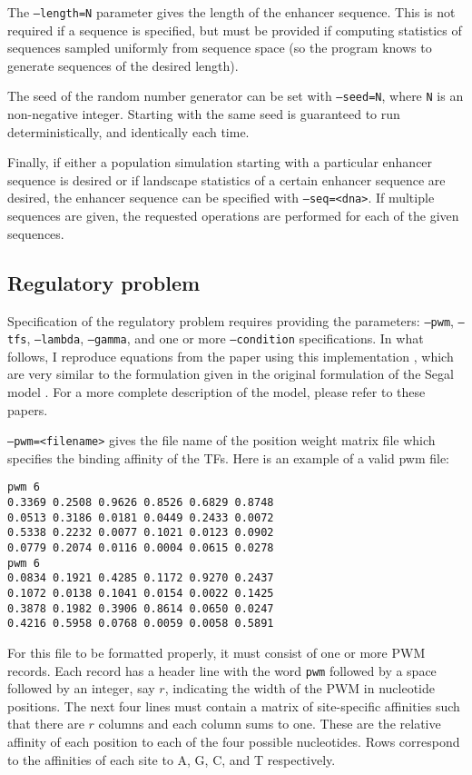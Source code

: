 \documentclass[11pt]{article}
\begin{document}
The \texttt{--length=N} parameter gives the length of the enhancer sequence. This is not required if a sequence is specified, but must be provided if computing statistics of sequences sampled uniformly from sequence space (so the program knows to generate sequences of the desired length).

The seed of the random number generator can be set with \texttt{--seed=N}, where \texttt{N} is an non-negative integer. Starting with the same seed is guaranteed to run deterministically, and identically each time.

Finally, if either a population simulation starting with a particular enhancer sequence is desired or if landscape statistics of a certain enhancer sequence are desired, the enhancer sequence can be specified with \texttt{--seq=<dna>}. If multiple sequences are given, the requested operations are performed for each of the given sequences.

\subsection{Regulatory problem}

Specification of the regulatory problem requires providing the parameters: \texttt{--pwm}, \texttt{--tfs}, \texttt{--lambda}, \texttt{--gamma}, and one or more \texttt{--condition} specifications. In what follows, I reproduce equations from the paper using this implementation \cite{Bullaughey:2011p6261}, which are very similar to the formulation given in the original formulation of the Segal model \cite{Segal:2008p460}. For a more complete description of the model, please refer to these papers.

\texttt{--pwm=<filename>} gives the file name of the position weight matrix file which specifies the binding affinity of the TFs. Here is an example of a valid pwm file:

\begin{verbatim}
pwm 6
0.3369 0.2508 0.9626 0.8526 0.6829 0.8748 
0.0513 0.3186 0.0181 0.0449 0.2433 0.0072 
0.5338 0.2232 0.0077 0.1021 0.0123 0.0902 
0.0779 0.2074 0.0116 0.0004 0.0615 0.0278 
pwm 6
0.0834 0.1921 0.4285 0.1172 0.9270 0.2437 
0.1072 0.0138 0.1041 0.0154 0.0022 0.1425 
0.3878 0.1982 0.3906 0.8614 0.0650 0.0247 
0.4216 0.5958 0.0768 0.0059 0.0058 0.5891 
\end{verbatim}

For this file to be formatted properly, it must consist of one or more PWM records. Each record has a header line with the word \texttt{pwm} followed by a space followed by an integer, say $r$, indicating the width of the PWM in nucleotide positions. The next four lines must contain a matrix of site-specific affinities such that there are $r$ columns and each column sums to one. These are the relative affinity of each position to each of the four possible nucleotides. Rows correspond to the affinities of each site to A, G, C, and T respectively.
\end{document}
